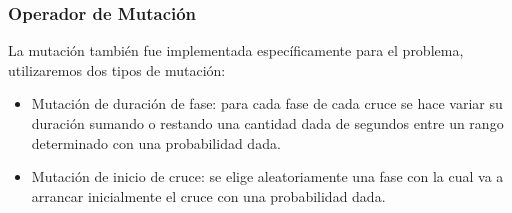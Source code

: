 \subsubsection{Operador de Mutación}
La  mutación también fue  implementada  específicamente para
el problema, utilizaremos dos tipos de mutación:
\begin{itemize}

\item Mutación de duración de fase: para cada fase de cada cruce se
hace variar su duración sumando o restando una cantidad dada
de segundos entre un rango determinado con una probabilidad
dada.
\item Mutación de inicio de cruce: se elige aleatoriamente una fase
con  la  cual  va  a  arrancar  inicialmente  el  cruce  con  una
probabilidad dada.

\end{itemize}

